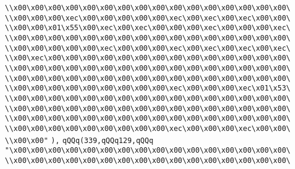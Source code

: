 \verb|\\x00\x00\x00\x00\x00\x00\x00\x00\x00\x00\x00\x00\x00\x00\x00\x00\|\newline
\verb|\\x00\x00\x00\xec\x00\x00\x00\x00\x00\xec\x00\xec\x00\xec\x00\x00\|\newline
\verb|\\x00\x00\x01\x55\x00\xec\x00\xec\x00\x00\x00\xec\x00\x00\x00\xec\|\newline
\verb|\\x00\x00\x00\x00\x00\x00\x00\x00\x00\x00\x00\x00\x00\x00\x00\x00\|\newline
\verb|\\x00\x00\x00\x00\x00\xec\x00\x00\x00\xec\x00\xec\x00\xec\x00\xec\|\newline
\verb|\\x00\xec\x00\x00\x00\x00\x00\x00\x00\x00\x00\x00\x00\x00\x00\x00\|\newline
\verb|\\x00\x00\x00\x00\x00\x00\x00\x00\x00\x00\x00\x00\x00\x00\x00\x00\|\newline
\verb|\\x00\x00\x00\x00\x00\x00\x00\x00\x00\x00\x00\x00\x00\x00\x00\x00\|\newline
\verb|\\x00\x00\x00\x00\x00\x00\x00\x00\x00\xec\x00\x00\x00\xec\x01\x53\|\newline
\verb|\\x00\x00\x00\x00\x00\x00\x00\x00\x00\x00\x00\x00\x00\x00\x00\x00\|\newline
\verb|\\x00\x00\x00\x00\x00\x00\x00\x00\x00\x00\x00\x00\x00\x00\x00\x00\|\newline
\verb|\\x00\x00\x00\x00\x00\x00\x00\x00\x00\x00\x00\x00\x00\x00\x00\x00\|\newline
\verb|\\x00\x00\x00\x00\x00\x00\x00\x00\x00\xec\x00\x00\x00\xec\x00\x00\|\newline
\verb|\\x00\x00"|\newline
\verb|),|\newline
\verb|qQQq(339,qQQq129,qQQq|\newline
\verb|"\x00\x00\x00\x00\x00\x00\x00\x00\x00\x00\x00\x00\x00\x00\x00\x00\|\newline
\verb|\\x00\x00\x00\x00\x00\x00\x00\x00\x00\x00\x00\x00\x00\x00\x00\x00\|\newline
